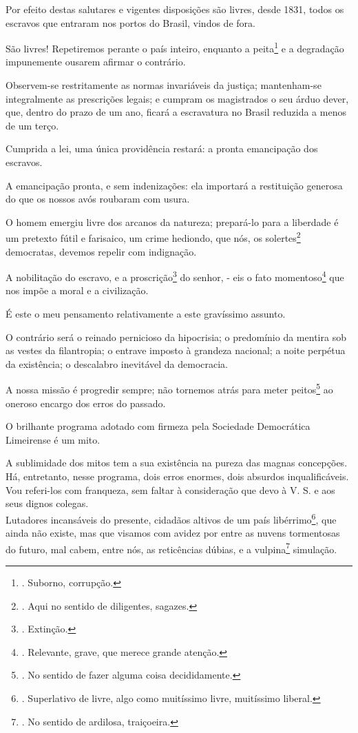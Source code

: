 Por efeito destas salutares e vigentes disposições são livres, desde
1831, todos os escravos que entraram nos portos do Brasil, vindos de
fora.

São livres! Repetiremos perante o país inteiro, enquanto a
peita\footnote{. Suborno, corrupção.} e a degradação impunemente ousarem
afirmar o contrário.

Observem-se restritamente as normas invariáveis da justiça; mantenham-se
integralmente as prescrições legais; e cumpram os magistrados o seu
árduo dever, que, dentro do prazo de um ano, ficará a escravatura no
Brasil reduzida a menos de um terço.

Cumprida a lei, uma única providência restará: a pronta emancipação dos
escravos.

A emancipação pronta, e sem indenizações: ela importará a restituição
generosa do que os nossos avós roubaram com usura.

O homem emergiu livre dos arcanos da natureza; prepará-lo para a
liberdade é um pretexto fútil e farisaico, um crime hediondo, que nós,
os solertes\footnote{. Aqui no sentido de diligentes, sagazes.}
democratas, devemos repelir com indignação.

A nobilitação do escravo, e a proscrição\footnote{. Extinção.} do
senhor, - eis o fato momentoso\footnote{. Relevante, grave, que merece
  grande atenção.} que nos impõe a moral e a civilização.

É este o meu pensamento relativamente a este gravíssimo assunto.

O contrário será o reinado pernicioso da hipocrisia; o predomínio da
mentira sob as vestes da filantropia; o entrave imposto à grandeza
nacional; a noite perpétua da existência; o descalabro inevitável da
democracia.

A nossa missão é progredir sempre; não tornemos atrás para meter
peitos\footnote{. No sentido de fazer alguma coisa decididamente.} ao
oneroso encargo dos erros do passado.

O brilhante programa adotado com firmeza pela Sociedade Democrática
Limeirense é um mito.

A sublimidade dos mitos tem a sua existência na pureza das magnas
concepções.\\
Há, entretanto, nesse programa, dois erros enormes, dois absurdos
inqualificáveis.\\
Vou referi-los com franqueza, sem faltar à consideração que devo à V. S.
e aos seus dignos colegas.\\
Lutadores incansáveis do presente, cidadãos altivos de um país
libérrimo\footnote{. Superlativo de livre, algo como muitíssimo livre,
  muitíssimo liberal.}, que ainda não existe, mas que visamos com avidez
por entre as nuvens tormentosas do futuro, mal cabem, entre nós, as
reticências dúbias, e a vulpina\footnote{. No sentido de ardilosa,
  traiçoeira.} simulação.

